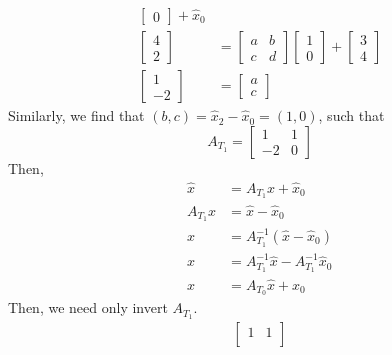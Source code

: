 \begin{solution}
\begin{align*}
\begin{bmatrix}
            0
        \end{bmatrix} + \hat{x}_0 \\
        \begin{bmatrix}
            4 \\
            2
        \end{bmatrix}
        &=
        \begin{bmatrix}
            a & b \\
            c & d
        \end{bmatrix}
        \begin{bmatrix}
            1 \\
            0
        \end{bmatrix} +
        \begin{bmatrix}
            3 \\
            4
        \end{bmatrix} \\
        \begin{bmatrix}
            1 \\
            -2
        \end{bmatrix}
        &=
        \begin{bmatrix}
            a \\ c
        \end{bmatrix}
    \end{align*}
    Similarly, we find that $(b, c) = \hat{x}_2 - \hat{x}_0 = (1, 0)$, such that
    \begin{equation*}
        A_{T_1} =
        \begin{bmatrix}
            1 & 1 \\
            -2 & 0
        \end{bmatrix}
    \end{equation*}
    Then,
    \begin{align*}
        \hat{x} &= A_{T_1} x + \hat{x}_0 \\
        A_{T_1} x &= \hat{x} - \hat{x}_0 \\
        x &= A_{T_1}^{-1} (\hat{x} - \hat{x}_0) \\
        x &= A_{T_1}^{-1} \hat{x} - A_{T_1}^{-1} \hat{x}_0 \\
        x &= A_{T_0} \hat{x} + x_0
    \end{align*}
    Then, we need only invert $A_{T_1}$.
    \begin{align*}
        \begin{bmatrix}
            1 & 1 \\

\end{bmatrix}
\end{align*}
\end{solution}
